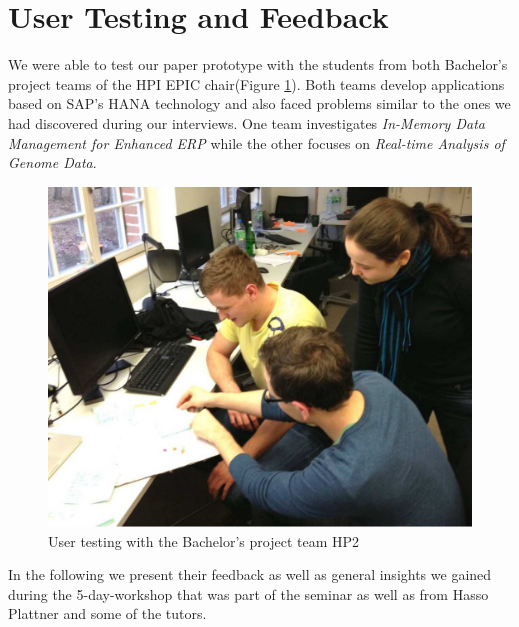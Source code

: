 
\section{User Testing and Feedback}
\label{sec:USER_TESTING}

We were able to test our paper prototype with the students from both Bachelor's project teams of the HPI EPIC chair(Figure \ref{fig:user_testing}). Both teams develop applications based on SAP's HANA technology and also faced problems similar to the ones we had discovered during our interviews. One team investigates \emph{In-Memory Data Management for Enhanced ERP} while the other focuses on \emph{Real-time Analysis of Genome Data}.

\begin{figure}
\begin{centering}
    \includegraphics[width=1.0\linewidth]{images/user_testing}
    \caption{User testing with the Bachelor's project team HP2}
    \label{fig:user_testing}
\end{centering}
\end{figure}

In the following we present their feedback as well as general insights we gained during the 5-day-workshop that was part of the seminar as well as from Hasso Plattner and some of the tutors.

